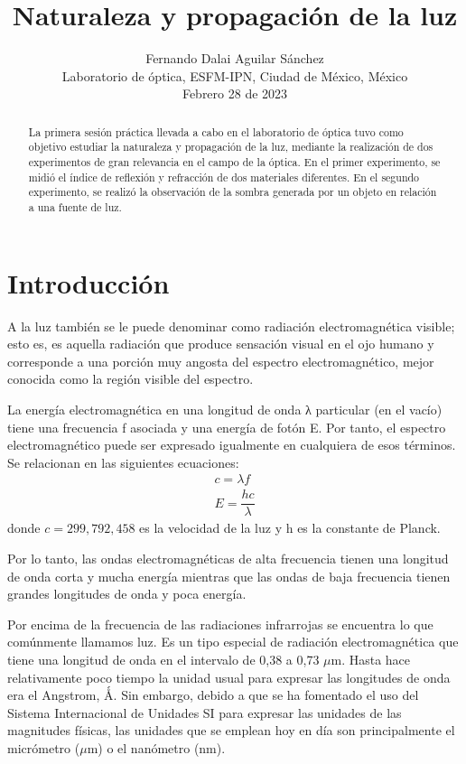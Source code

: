 \documentclass[10pt,journal]{IEEEtran}
\begin{document}
\title{Naturaleza y propagación de la luz}

\author{Fernando Dalai Aguilar Sánchez \\ Laboratorio de óptica, ESFM-IPN, Ciudad de México, México \\Febrero 28 de 2023}


\maketitle{}  

\begin{abstract}
La primera sesión práctica llevada a cabo en el laboratorio de óptica tuvo como objetivo estudiar la naturaleza y propagación de la luz, mediante la realización de dos experimentos de gran relevancia en el campo de la óptica.
En el primer experimento, se midió el índice de reflexión y refracción de dos materiales diferentes.
En el segundo experimento, se realizó la observación de la sombra generada por un objeto en relación a una fuente de luz. 
\end{abstract}  

\section{Introducción}
A la luz también se le puede denominar como radiación electromagnética visible; esto
es, es aquella radiación que produce sensación visual en el ojo humano y corresponde a
una porción muy angosta del espectro electromagnético, mejor conocida como la región
visible del espectro.

La energía electromagnética en una longitud de onda λ particular (en el vacío) tiene una
frecuencia f asociada y una energía de fotón E. Por tanto, el espectro electromagnético
puede ser expresado igualmente en cualquiera de esos términos. Se relacionan en las
siguientes ecuaciones: 
\begin{align}
c = \lambda f \\
E = \dfrac{h c}{\lambda}
\end{align}
donde $c = 299{,}792{,}458$ es la velocidad de la luz y h es la constante de Planck. 

Por lo tanto, las ondas electromagnéticas de alta frecuencia tienen una longitud de onda
corta y mucha energía mientras que las ondas de baja frecuencia tienen grandes
longitudes de onda y poca energía.

Por encima de la frecuencia de las radiaciones infrarrojas se encuentra lo que
comúnmente llamamos luz. Es un tipo especial de radiación electromagnética que tiene
una longitud de onda en el intervalo de 0,38 a 0,73 $\mu$m. Hasta hace relativamente poco
tiempo la unidad usual para expresar las longitudes de onda era el Angstrom, Ǻ. Sin
embargo, debido a que se ha fomentado el uso del Sistema Internacional de Unidades SI
para expresar las unidades de las magnitudes físicas, las unidades que se emplean hoy
en día son principalmente el micrómetro ($\mu$m) o el nanómetro (nm).
\end{document}
